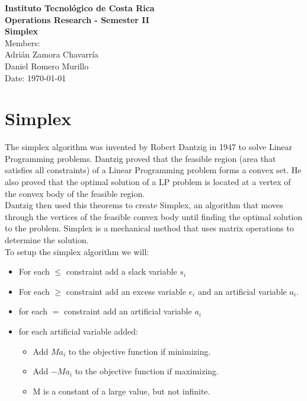 \documentclass[12pt,a4paper]{article}
\begin{document}
\begin{titlepage}
    \centering
    \vspace*{3cm}
    {\Huge \textbf{Instituto Tecnológico de Costa Rica}} \\[2cm]
    {\Large \textbf{Operations Research - Semester II}} \\[2cm]
    {\LARGE \textbf{Simplex}} \\[3cm]
    {\Large Members:} \\[0.5cm]
    {\large Adrián Zamora Chavarría \\ Daniel Romero Murillo} \\[2cm]
    {\large Date: \today}
    \vfill
\end{titlepage}
\newpage
\section*{Simplex}
The simplex algorithm was invented by Robert Dantzig in 1947 to solve Linear Programming problems. Dantzig proved that the feasible region (area that satisfies all constraints) of a Linear Programming problem forms a convex set. He also proved that the optimal solution of a LP problem is located at a vertex of the convex body of the feasible region. \\

Dantzig then used this theorems to create Simplex, an algorithm that moves through the vertices of the feasible convex body until finding the optimal solution to the problem. Simplex is a mechanical method that uses matrix operations to determine the solution. \\

To setup the simplex algorithm we will:
\begin{itemize}
    \item For each $\leq$ constraint add a slack variable $s_i$
    \item For each $\geq$ constraint add an excess variable $e_i$ and an artificial variable $a_i$.
    \item for each $=$ constraint add an artificial variable $a_i$
    \item for each artificial variable added:
    \begin{itemize}
        \item Add $Ma_i$ to the objective function if minimizing.
        \item Add $-Ma_i$ to the objective function if maximizing.
        \item M is a constant of a large value, but not infinite.
    \end{itemize}
\end{itemize}
\end{document}
